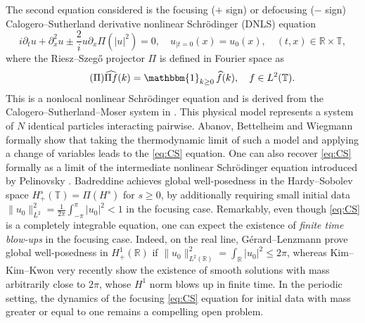 \documentclass [11pt] {article}
\begin{document}
The second equation considered is the focusing ($+$ sign) or defocusing ($-$ sign) Calogero--Sutherland derivative nonlinear Schr\"odinger (DNLS) equation
\begin{equation}
\label{eq:CS}\tag{CS}
i\partial_t u + \partial_x^2u \pm \frac{2}{i} u\partial_x \Pi(|u|^2) = 0,\quad  u_{|t=0}(x)= u_{0}(x), \quad (t,x) \in \mathbb{R} \times \mathbb{T}, 
\end{equation}
\renewcommand*{\theHequation}{notag2.\theequation}%
where the Riesz--Szeg\H o projector $\Pi$ is defined in Fourier space as 
\begin{equation}
\label{eq:Pi}\tag{$\Pi$}
\widehat{\Pi f}(k) = \mathbbm{1}_{k\ge 0} \, \widehat{f}(k), \quad f\in L^2(\mathbb T).
\end{equation}
\renewcommand*{\theHequation}{notag3.\theequation}%
This is a nonlocal nonlinear Schr\"odinger equation and is derived from the Calogero--Sutherland--Moser system in \cite{Ca71, Su71, Su75}. This physical model represents a system of $N$ identical particles interacting pairwise. Abanov, Bettelheim and Wiegmann  \cite{ABW} formally show that taking the thermodynamic limit of such a model and applying a change of variables leads
to the \eqref{eq:CS} equation. One can also recover \eqref{eq:CS} formally as a limit of the intermediate nonlinear Schr\"odinger equation introduced by Pelinovsky \cite{Pe95}. Badreddine \cite{Bad24} achieves global well-posedness in the Hardy--Sobolev space $H_{+}^s(\mathbb{T}) = \Pi(H^s)$ for $s\geq 0$, 
by additionally requiring small initial data $\| u_{0}\|_{L^{2}}^2=\frac{1}{2\pi}\int_{-\pi}^{\pi}|u_0|^2 < 1$ in the focusing case.   
Remarkably, even though \eqref{eq:CS} is a completely integrable equation, one can expect the existence of {\it finite time blow-ups} in the focusing case. 
Indeed, on the real line, Gérard--Lenzmann \cite{GL22} prove global well-posedness in $H^1_+(\mathbb{R})$ if $\|u_0\|_{L^2(\mathbb R)}^2=\int_{\mathbb R}|u_0|^2\leq 2\pi$, whereas Kim--Kim--Kwon \cite{KKK24} very recently show the existence of smooth solutions with mass arbitrarily close to $2\pi$, whose $H^1$ norm blows up in finite time. In the periodic setting, the dynamics of the focusing \eqref{eq:CS} equation for initial data with mass greater or equal to one remains a compelling open problem.
\newline
\end{document}
